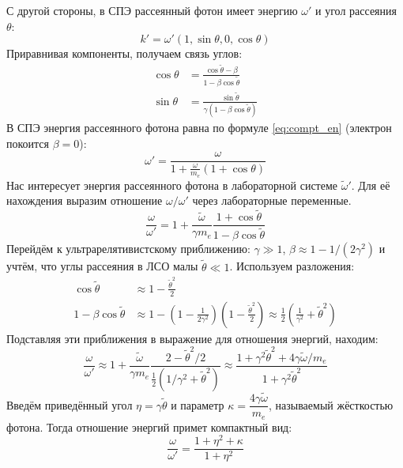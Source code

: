\documentclass[14pt, a4paper]{extreport}
\begin{document}
С другой стороны, в СПЭ рассеянный фотон имеет энергию $\omega'$ и угол рассеяния $\theta$:
\begin{equation}
    \label{eq:moment}
    k' = \omega' (1, \sin\theta, 0, \cos\theta)
\end{equation}
Приравнивая компоненты, получаем связь углов:
\begin{align}
    \cos\theta &= \frac{\cos\tilde{\theta} - \beta}{1 - \beta\cos\tilde{\theta}} \label{eq:cos_theta} \\
    \sin\theta &= \frac{\sin\tilde{\theta}}{\gamma(1-\beta\cos\tilde{\theta})} \label{eq:sin_theta}
\end{align}
В СПЭ энергия рассеянного фотона равна по формуле \eqref{eq:compt_en} (электрон покоится $\beta =0$):
\begin{equation}
    \omega' = \frac{\omega}{1 + \frac{\omega}{m_e}(1+\cos\theta)}
\end{equation}
Нас интересует энергия рассеянного фотона в лабораторной системе $\tilde{\omega}'$. 
Для её нахождения выразим отношение $\omega/\omega'$ через лабораторные переменные. 
\begin{equation}
    \frac{\omega}{\omega'} = 1 + \frac{\tilde{\omega}}{\gamma m_e} \frac{1 + \cos\tilde{\theta}}{1 - \beta\cos\tilde{\theta}}
\end{equation}
Перейдём к ультрарелятивистскому приближению: $\gamma \gg 1$, $\beta \approx 1 - 1/(2\gamma^2)$ и учтём, что углы рассеяния в ЛСО малы $\tilde{\theta} \ll 1$. 
Используем разложения:
\begin{align}
    \cos\tilde{\theta} &\approx 1 - \frac{\tilde{\theta}^2}{2} \\
    1 - \beta\cos\tilde{\theta} &\approx 1 - \left(1 - \frac{1}{2\gamma^2}\right)\left(1 - \frac{\tilde{\theta}^2}{2}\right) \approx \frac{1}{2}\left(\frac{1}{\gamma^2} + \tilde{\theta}^2\right)
\end{align}
Подставляя эти приближения в выражение для отношения энергий, находим:
\begin{equation}
    \frac{\omega}{\omega'} \approx 1 + \frac{\tilde{\omega}}{\gamma m_e} \frac{2-\tilde{\theta}^2 /2}{\frac{1}{2}(1/\gamma^2 + \tilde{\theta}^2)} 
    \approx \frac{1 + \gamma^2\tilde{\theta}^2 + 4\gamma\tilde{\omega}/m_e}{1 + \gamma^2\tilde{\theta}^2}
\end{equation}
Введём приведённый угол $\eta = \gamma\tilde{\theta}$ и параметр $\kappa = \dfrac{4\gamma\tilde{\omega}}{m_e}$, называемый жёсткостью фотона.
Тогда отношение энергий примет компактный вид:
\begin{equation}
    \frac{\omega}{\omega'} = \frac{1 + \eta^2 + \kappa}{1 + \eta^2}
\end{equation}
\end{document}
